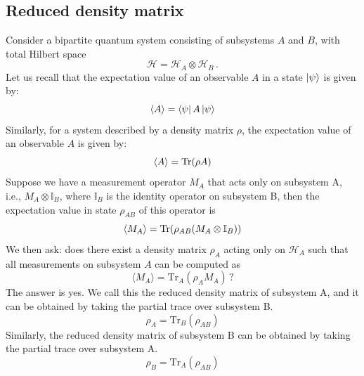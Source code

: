 \documentclass[12pt,oneside,openright]{report}
\theoremstyle{definition}
\theoremstyle{plain}
\theoremstyle{remark}
\begin{document}
\subsection{Reduced density matrix}
Consider a bipartite quantum system consisting of subsystems $A$ and $B$, with total 
Hilbert space
\begin{equation}
\mathcal{H} = \mathcal{H}_A \otimes \mathcal{H}_B\,.
\end{equation}
Let us recall that the expectation value of an observable $A$ in a state $\ket{\psi}$ is given by:
\begin{equation}
  \langle A \rangle = \bra{\psi} A \ket{\psi} 
\end{equation}
Similarly, for a system described by a density matrix $\rho$, the expectation value of an observable $A$ is given by:
\begin{equation}
  \langle A \rangle = \Tr(\rho A)
\end{equation}
Suppose we have a measurement operator $M_A$ that acts only on subsystem A,
i.e., $M_A \otimes \mathbb{I}_B$, where $\mathbb{I}_B$ is the identity operator on subsystem B,
then the expectation value in state $\rho_{AB}$ of this operator is
\begin{equation}
  \langle M_A \rangle = \Tr(\rho_{AB}(M_A \otimes \mathbb{I}_B))
\end{equation}
We then ask: does there exist a density matrix $\rho_A$ acting only on $\mathcal{H}_A$ such that all measurements on subsystem $A$ can be computed as
\begin{equation}
\langle M_A \rangle = \text{Tr}_A(\rho_A M_A)\,?
\label{eq:rhoA_requirement}
\end{equation}
The answer is yes. We call this the reduced density matrix of subsystem A, and it can be obtained by taking the partial trace over subsystem B.
\begin{equation}
\rho_A = \text{Tr}_B(\rho_{AB})
\end{equation}
Similarly, the reduced density matrix of subsystem B can be obtained by taking the partial trace over subsystem A.
\begin{equation}
  \rho_B = \text{Tr}_A(\rho_{AB})
\end{equation}
\end{document}
